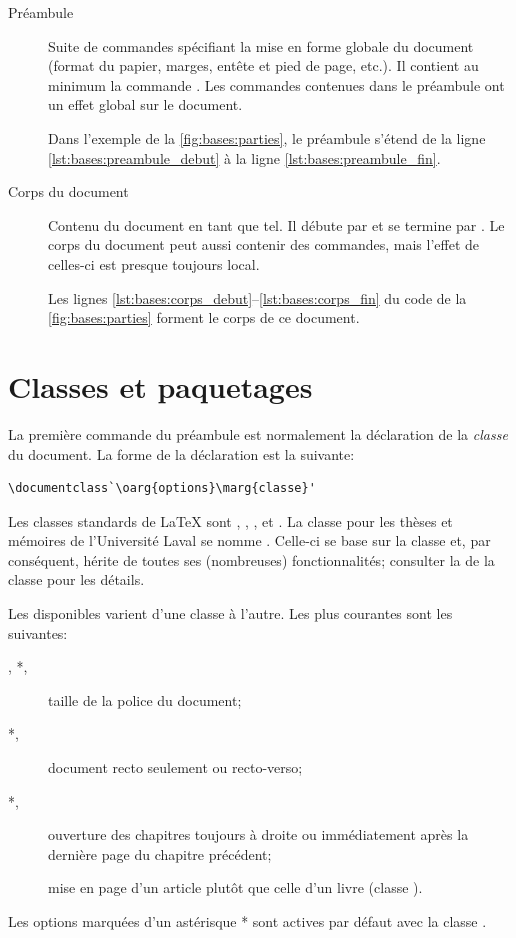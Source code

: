 \begin{description}
\item[Préambule] Suite de commandes spécifiant la mise en forme
  globale du document (format du papier, marges, entête et pied de
  page, etc.). Il contient au minimum la commande
  \cmd{\documentclass}. Les commandes contenues dans le préambule ont
  un effet global sur le document.

  Dans l'exemple de la \autoref{fig:bases:parties}, le préambule
  s'étend de la ligne \ref*{lst:bases:preambule_debut} à la ligne
  \ref*{lst:bases:preambule_fin}.
\item[Corps du document] Contenu du document en tant que tel.
  Il débute par \verb== et se termine par
    \verb==. Le corps du document peut aussi contenir
  des commandes, mais l'effet de celles-ci est presque toujours local.

  Les lignes \ref*{lst:bases:corps_debut}--\ref*{lst:bases:corps_fin}
  du code de la \autoref{fig:bases:parties} forment le corps de ce
  document.
\end{description}


\section{Classes et paquetages}

La première commande du préambule est normalement la déclaration de la
\emph{classe} du document. La forme de la déclaration est la suivante:
\begin{lstlisting}
\documentclass`\oarg{options}\marg{classe}'
\end{lstlisting}
Les classes standards de {\LaTeX} sont ,
, ,  et . La
classe pour les thèses et mémoires de l'Université Laval se nomme
 \citep{ulthese}. Celle-ci se base sur la classe
 et, par conséquent, hérite de toutes ses (nombreuses)
fonctionnalités; consulter la %
de la classe  pour les détails.

Les  disponibles varient d'une classe à l'autre. Les
plus courantes sont les suivantes:
\begin{description}
\item[\mdseries \code{10pt}, \code{11pt}*, \code{12pt}] taille
  de la police du document;
\item[\mdseries {}*, ] document
  recto seulement ou recto-verso;
\item[\mdseries {}*, ] ouverture
  des chapitres toujours à droite ou immédiatement après la dernière
  page du chapitre précédent;
\item[\mdseries {}] mise en page d'un article plutôt que celle d'un
  livre (classe ).
\end{description}
Les options marquées d'un astérisque * sont actives par défaut avec
la classe .

